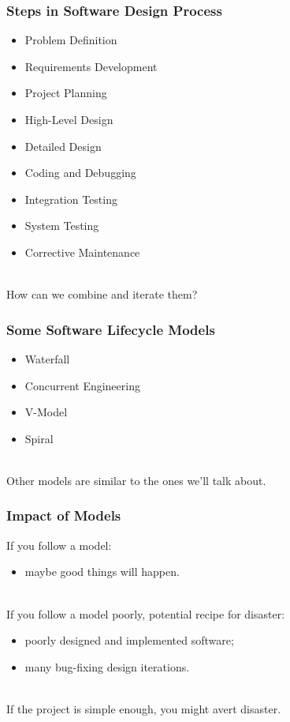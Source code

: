 \begin{frame}
\frametitle{Steps in Software Design Process}

\begin{changemargin}{1cm}
\begin{itemize}
\item Problem Definition
\item Requirements Development
\item Project Planning
\item High-Level Design
\item Detailed Design
\item Coding and Debugging
\item Integration Testing
\item System Testing
\item Corrective Maintenance
\end{itemize}
~\\
How can we combine and iterate them?

\end{changemargin}
\end{frame}

\begin{frame}
\frametitle{Some Software Lifecycle Models}

\begin{changemargin}{1cm}
\begin{itemize}
\item Waterfall
\item Concurrent Engineering
\item V-Model
\item Spiral
\end{itemize}
~\\

Other models are similar to the ones we'll talk 
about.
\end{changemargin}
\end{frame}

\begin{frame}
\frametitle{Impact of Models}

\begin{changemargin}{1cm}
If you follow a model: \\
\begin{itemize}
\item maybe good things will happen. 
\end{itemize} ~\\

If you follow a model poorly,
potential recipe for disaster:
\begin{itemize}
\item poorly designed
and implemented software;
\item many bug-fixing design iterations.
\end{itemize} ~\\
If the project is simple enough, you might avert disaster.

\end{changemargin}
\end{frame}




